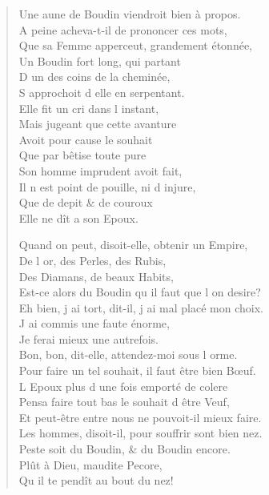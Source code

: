 \begin{verse}
Une aune de Boudin viendroit bien à propos. \\
A peine acheva-t-il de prononcer ces mots, \\
Que sa Femme apperceut, grandement étonnée, \\
\vin Un Boudin fort long, qui partant \\
\vin D\textquotesingle{} un des coins de la cheminée, \\
\vin S\textquotesingle{} approchoit d\textquotesingle{} elle en serpentant. \\
\vin Elle fit un cri dans l\textquotesingle{} instant, \\
\vin Mais jugeant que cette avanture \\
\vin Avoit pour cause le souhait \\
\vin Que par bêtise toute pure \\
\vin Son homme imprudent avoit fait, \\
\vin Il n\textquotesingle{} est point de pouille, ni d\textquotesingle{} injure, \\
\vin Que de depit \& de couroux \\
\vin Elle ne dît a son Epoux.

Quand on peut, disoit-elle, obtenir un Empire, \\
\vin De l\textquotesingle{} or, des Perles, des Rubis, \\
\vin Des Diamans, de beaux Habits, \\
Est-ce alors du Boudin qu\textquotesingle{} il faut que l\textquotesingle{} on desire? \\
Eh bien, j\textquotesingle{} ai tort, dit-il, j\textquotesingle{} ai mal placé mon choix. \\
\vin J\textquotesingle{} ai commis une faute énorme, \\
\vin Je ferai mieux une autrefois. \\
Bon, bon, dit-elle, attendez-moi sous l\textquotesingle{} orme. \\
Pour faire un tel souhait, il faut être bien Bœuf. \\
L\textquotesingle{} Epoux plus d\textquotesingle{} une fois emporté de colere \\
Pensa faire tout bas le souhait d\textquotesingle{} être Veuf, \\
Et peut-être entre nous ne pouvoit-il mieux faire. \\
Les hommes, disoit-il, pour souffrir sont bien nez. \\
Peste soit du Boudin, \& du Boudin encore. \\
\vin Plût à Dieu, maudite Pecore, \\
\vin Qu\textquotesingle{} il te pendît au bout du nez!


\end{verse}
